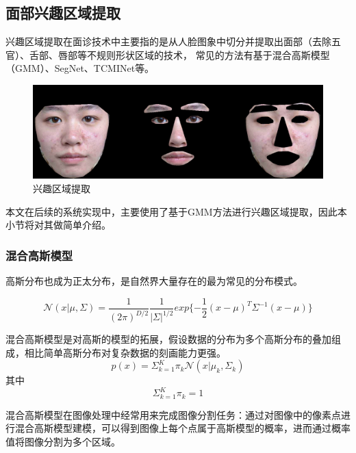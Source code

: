 \subsection{面部兴趣区域提取}
兴趣区域提取在面诊技术中主要指的是从人脸图象中切分并提取出面部（去除五官）、舌部、唇部等不规则形状区域的技术，
常见的方法有基于混合高斯模型（GMM）\cite{Hu2016Robust}、SegNet\cite{Badrinarayanan2017SegNet}、TCMINet\cite{li2020tcminet}等。
\begin{figure}[h]
    \centering
    \includegraphics[width=12cm]{images/roi.png}
    \caption{兴趣区域提取}
    \label{fig:roi}
\end{figure}
本文在后续的系统实现中，主要使用了基于GMM方法进行兴趣区域提取，因此本小节将对其做简单介绍。


\subsubsection{混合高斯模型}
高斯分布也成为正太分布，是自然界大量存在的最为常见的分布模式。

\begin{equation}
    \mathcal{N}(x | \mu, \Sigma) = \frac{1}{(2\pi)^{D/2}}\frac{1}{|\Sigma|^{1/2}}exp\{-\frac{1}{2}(x-\mu)^T\Sigma^{-1}(x-\mu)\}
\end{equation}

混合高斯模型是对高斯的模型的拓展，假设数据的分布为多个高斯分布的叠加组成，相比简单高斯分布对复杂数据的刻画能力更强。
\begin{equation}
p(x) = \Sigma^K_{k=1}\pi_k\mathcal{N}(x|\mu_k,\Sigma_k)
\end{equation}
其中
\begin{equation}
\Sigma^K_{k=1}\pi_k = 1
\end{equation}

混合高斯模型在图像处理中经常用来完成图像分割任务：通过对图像中的像素点进行混合高斯模型建模，可以得到图像上每个点属于高斯模型的概率，进而通过概率值将图像分割为多个区域。

